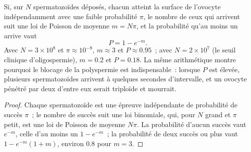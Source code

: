\begin{theorem}\label{thm:b2:mammal-reproduction:poisson}
Si, sur $N$ spermatozoïdes déposés, chacun atteint la surface de
l'ovocyte indépendamment avec une faible probabilité $\pi$, le nombre de
ceux qui arrivent suit une loi de Poisson de moyenne $m = N\pi$, et la
probabilité qu'au moins un arrive vaut
\[
P = 1 - e^{-m}.
\]
Avec $N = 3\times 10^{8}$ et $\pi \approx 10^{-8}$, $m \approx 3$
et $P \approx 0.95$~; avec $N = 2\times 10^{7}$ (le seuil clinique
d'oligospermie), $m = 0.2$ et $P = 0.18$. La même arithmétique montre
pourquoi le blocage de la polyspermie est indispensable~: lorsque $P$ est
élevée, plusieurs spermatozoïdes arrivent à quelques secondes
d'intervalle, et un ovocyte pénétré par deux d'entre eux serait triploïde
et mourrait.
\end{theorem}
\begin{proof}
Chaque spermatozoïde est une épreuve indépendante de probabilité de
succès $\pi$~; le nombre de succès suit une loi binomiale, qui, pour $N$
grand et $\pi$ petit, est une loi de Poisson de moyenne $N\pi$. La
probabilité d'aucun succès vaut $e^{-m}$, celle d'au moins un
$1 - e^{-m}$~; la probabilité de deux succès ou plus vaut
$1 - e^{-m}(1 + m)$, environ $0.8$ pour
$m = 3$.
\end{proof}

